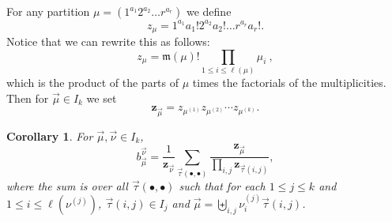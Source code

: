 \documentclass[10pt]{amsart}
\newtheorem{cor}[theorem]{Corollary}
\theoremstyle{definition}
\theoremstyle{remark}
\begin{document}
For any partition $\mu = (1^{a_1} 2^{a_2} \ldots r^{a_r})$ we define
\[
    z_\mu = 1^{a_1} a_1! 2^{a_2} a_2! \ldots r^{a_r}a_r!.
\]
Notice that we can rewrite this as follows:
\[
    z_\mu = \mathfrak{m}(\mu)!\prod_{1\leqslant i\leqslant \ell(\mu)}\mu_i ~,
\]
which is the product of the parts of $\mu$ times the factorials of the multiplicities.
Then for $\vec{\mu} \in I_k$ we set
\[
    \mathbf{z}_{\vec{\mu}} = z_{\mu^{(1)}}z_{\mu^{(2)}}\cdots z_{\mu^{(k)}}.
\]

\begin{cor}
For $\vec{\mu}, \vec{\nu} \in I_k$,
\begin{equation}\label{eq:BinZ}
    b_{\vec{\mu}}^{\vec{\nu}} = \frac{1}{\mathbf{z}_{\vec{\nu}}} \sum_{\vec{\tau}(\bullet, \bullet)}\frac{\mathbf{z}_{\vec{\mu}}}{\prod_{i,j}\mathbf{z}_{\vec{\tau}(i,j)}},
\end{equation}
where the sum is over all $\vec{\tau}(\bullet, \bullet)$
such that for each $1\leqslant j\leqslant k$ and $1 \leqslant i \leqslant \ell(\nu^{(j)})$,
$\vec{\tau}(i,j) \in I_j$
and $\vec{\mu} = \biguplus_{i,j} \nu_i^{(j)} \vec{\tau}(i,j)$.
\end{cor}
\end{document}
